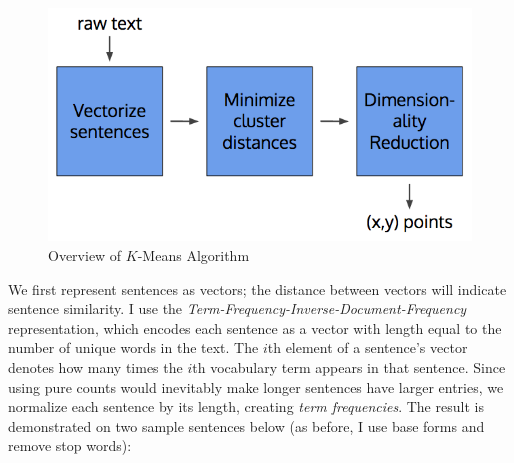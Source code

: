 \documentclass[a4paper, 12pt,notitlepage]{article} %
\newenvironment{figurecenter}{%
	\setlength\topsep{-7pt}
	\setlength\parskip{-7pt}
	\singlespacing %
	\begin{center}
	}{%
	\end{center}
\vspace{-5pt}
}
\numberwithin{dummy}{subsection}
\numberwithin{dummy}{section}
\theoremstyle{named}
\theoremstyle{definition}
\theoremstyle{definition}
\begin{document}
\begin{figure}[H]
	\begin{figurecenter}
	\includegraphics[scale=0.4]{image13.png}
	\caption{Overview of $K$-Means Algorithm}
	\label{epsilon}
	\end{figurecenter}
\end{figure}

We first represent sentences as vectors; the distance between vectors will indicate sentence similarity. I use the \textit{Term-Frequency-Inverse-Document-Frequency} representation, which encodes each sentence as a vector with length equal to the number of unique words in the text. The $i$th element of a sentence's vector denotes how many times the $i$th vocabulary term appears in that sentence. Since using pure counts would inevitably make longer sentences have larger entries, we normalize each sentence by its length, creating \textit{term frequencies}. The result is demonstrated on two sample sentences below (as before, I use base forms and remove stop words):

\end{document}
